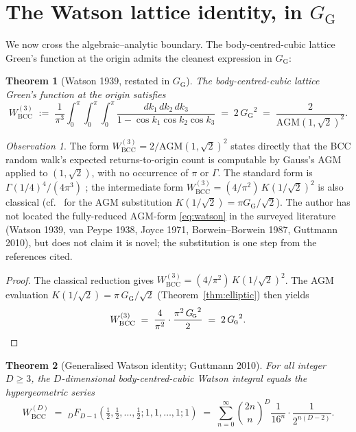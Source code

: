 \documentclass[11pt]{article}
\newtheorem{theorem}{Theorem}[section]
\theoremstyle{definition}
\theoremstyle{remark}
\newtheorem*{observation}{Observation}
\newcommand{\GG}{G_{\!\scriptscriptstyle\mathrm{G}}}
\newcommand{\AGM}{\mathrm{AGM}}
\begin{document}
\section{The Watson lattice identity, in $\GG$}\label{sec:watson}

We now cross the algebraic--analytic boundary. The body-centred-cubic
lattice Green's function at the origin admits the cleanest expression
in $\GG$:

\begin{theorem}[Watson 1939, restated in $\GG$]\label{thm:watson}
The body-centred-cubic lattice Green's function at the origin satisfies
\begin{equation}
W^{(3)}_{\mathrm{BCC}} \;:=\; \frac{1}{\pi^3}\int_0^\pi\!\!\int_0^\pi\!\!\int_0^\pi \frac{dk_1\,dk_2\,dk_3}{1 - \cos k_1 \cos k_2 \cos k_3} \;=\; 2\,{\GG}^2 \;=\; \frac{2}{\AGM(1, \sqrt 2)^2}.
\label{eq:watson}
\end{equation}
\end{theorem}

\begin{observation}
The form $W^{(3)}_{\mathrm{BCC}} = 2/\AGM(1, \sqrt 2)^{2}$ states
directly that the BCC random walk's expected returns-to-origin count
is computable by Gauss's AGM applied to $(1, \sqrt 2)$, with no
occurrence of $\pi$ or $\Gamma$. The standard form is
$\Gamma(1/4)^{4}/(4\pi^{3})$ \cite{watson1939, vanPeype}; the
intermediate form $W^{(3)}_{\mathrm{BCC}} = (4/\pi^{2})\,K(1/\sqrt 2)^{2}$
is also classical (cf.\ \cite{borweinAGM} for the AGM substitution
$K(1/\sqrt 2) = \pi\GG/\sqrt 2$). The author has not located the
fully-reduced $\AGM$-form \eqref{eq:watson} in the surveyed
literature (Watson 1939, van Peype 1938, Joyce 1971, Borwein--Borwein
1987, Guttmann 2010), but does not claim it is novel; the substitution
is one step from the references cited.
\end{observation}

\begin{proof}
The classical reduction \cite{watson1939} gives
$W^{(3)}_{\mathrm{BCC}} = (4/\pi^2)\,K(1/\sqrt 2)^2$.
The AGM evaluation $K(1/\sqrt 2) = \pi\,\GG/\sqrt 2$ (Theorem~\ref{thm:elliptic})
then yields
\[
W^{(3)}_{\mathrm{BCC}} \;=\; \frac{4}{\pi^2} \cdot \frac{\pi^2\,{\GG}^2}{2}
                       \;=\; 2\,{\GG}^2. \qedhere
\]
\end{proof}

\begin{theorem}[Generalised Watson identity; Guttmann 2010]\label{thm:gen-watson}
For all integer $D \geq 3$, the $D$-dimensional body-centred-cubic Watson
integral equals the hypergeometric series
\begin{equation}
W^{(D)}_{\mathrm{BCC}} \;=\; {}_DF_{D-1}\!\left(\tfrac12, \tfrac12, \ldots, \tfrac12; 1, 1, \ldots, 1; 1\right) \;=\; \sum_{n=0}^\infty \binom{2n}{n}^{\!D} \frac{1}{16^{n}}\!\cdot\!\frac{1}{2^{n(D-2)}}.
\label{eq:gen-watson}
\end{equation}
\end{theorem}
\end{document}
